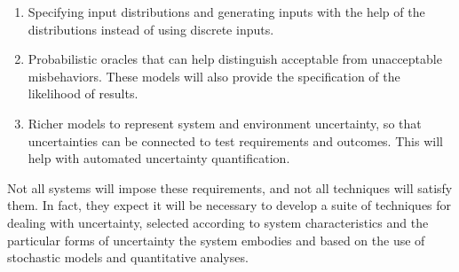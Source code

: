 \begin{enumerate}
  \item Specifying input distributions and generating inputs with the help of the distributions instead of using discrete inputs.
  \item Probabilistic oracles that can help distinguish acceptable from unacceptable misbehaviors. These models will also provide the specification of the likelihood of results.
  \item Richer models to represent system and environment uncertainty, so that uncertainties can be connected to test requirements and outcomes. This will help with automated uncertainty quantification.
\end{enumerate}
Not all systems will impose these requirements, and not all techniques will satisfy them. In fact, they expect it will be necessary to develop a suite of techniques for dealing with uncertainty, selected according to system characteristics and the particular forms of uncertainty the system embodies and based on the use of stochastic models and quantitative analyses.

